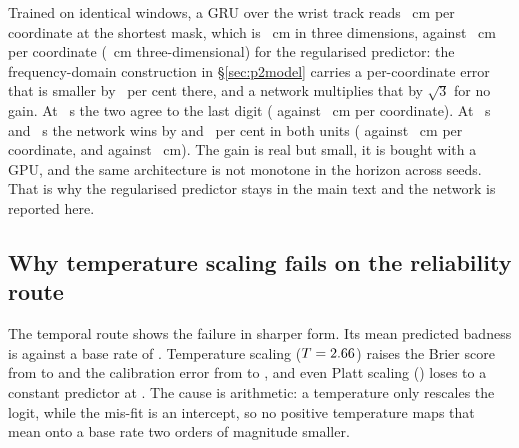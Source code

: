 \documentclass{swmcmthesis}
\begin{document}
\begin{appendices}
Trained on identical windows, a GRU over the wrist track reads
\slotPGPUAWristRMSE{}~cm per coordinate at the shortest mask, which is
\slotPGpuAThreeD{}~cm in three dimensions, against \slotPRidgeAPerCoord{}~cm per
coordinate (\slotPTwoARidgeRMSE{}~cm three-dimensional) for the regularised predictor:
the frequency-domain construction in \S\ref{sec:p2model} carries a per-coordinate error that
is smaller by \slotPGpuAPerCoordGapPct{}~per cent there, and a network multiplies that by
$\sqrt{3}$ for no gain. At \slotMaskB{}~s the two agree to the last digit
(\slotPGPUBSTwoRMSE{} against \slotPRidgeBPerCoord{}~cm per coordinate). At
\slotMaskC{}~s and \slotMaskD{}~s the network wins by \slotPGpuWinCPerCoordPct{} and
\slotPGpuWinDPerCoordPct{}~per cent in both units (\slotPGPUCBothRMSE{} against
\slotPRidgeCPerCoord{}~cm per coordinate, and \slotPGPUDBothRMSE{} against
\slotPRidgeDPerCoord{}~cm). The gain is real but small, it is bought with a GPU, and the
same architecture is not monotone in the horizon across seeds. That is why the
regularised predictor stays in the main text and the network is reported here.

\subsection*{Why temperature scaling fails on the reliability route}
\label{app:calib}

The temporal route shows the failure in sharper form. Its mean predicted badness is
\slotPCalMeanRaw{} against a base rate of \slotPCalBase{}. Temperature scaling
($T=2.66{}$) raises the Brier score from \slotPCalBrierRaw{} to
\slotPCalBrierTemp{} and the calibration error from \slotPCalECEraw{} to
\slotPCalECEt{}, and even Platt scaling (\slotPCalBrierPlatt{}) loses to a constant
predictor at \slotPCalBrierConst{}. The cause is arithmetic: a temperature only
rescales the logit, while the mis-fit is an intercept, so no positive temperature maps
that mean onto a base rate two orders of magnitude smaller.


\end{appendices}
\end{document}
